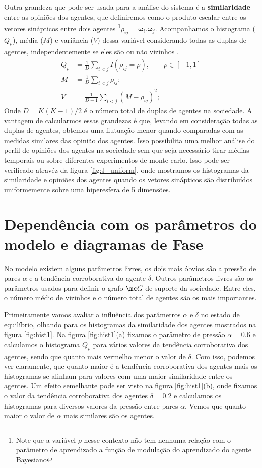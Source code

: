 Outra grandeza que pode ser usada para a análise do sistema é a
\textbf{similaridade} entre as opiniões dos agentes, que definiremos como o
produto escalar entre os vetores sinápticos entre dois agentes \footnote{Note
que a variável $\rho$ nesse contexto não tem nenhuma relação com o
parâmetro de aprendizado a função de modulação do aprendizado do agente
Bayesiano}$ \rho_{ij} = \bm{\omega}_i.\bm{\omega}_j$. Acompanhamos
o histograma ($Q_\rho$), média ($M$) e variância ($V$) dessa variável
considerando todas as duplas de agentes, independentemente se eles são ou
não vizinhos .
\begin{align}
    Q_\rho &= \frac{1}{D}\sum_{i<j}I\left( \rho_{ij} = \rho \right),
        \qquad \rho \in \left[-1, 1\right] \label{eq:overA1} \\
    M &= \frac{1}{D}\sum_{i<j} \rho_{ij}; \label{eq:M}\\ 
    V &= \frac{1}{D-1}\sum_{i<j}\left( M - \rho_{ij} \right)^2; \label{eq:V}
\end{align}
Onde $D = K\left(K-1\right)/2$ é o número total de duplas de agentes
na sociedade. A vantagem de calcularmos essas grandezas é que, levando em
consideração todas as duplas de agentes, obtemos uma flutuação menor quando
comparadas com as medidas similares das opinião dos agentes. Isso possibilita
uma melhor análise do perfil de opiniões dos agentes na sociedade sem que
seja necessário tirar médias temporais ou sobre diferentes experimentos de
monte carlo. Isso pode ser verificado atravéz da figura \ref{fig:J_uniform},
onde mostramos os histogramas da similaridade e opiniões dos agentes quando
os vetores sinápticos são distribuídos uniformemente sobre uma hiperesfera
de 5 dimensões.

\newpage
\section{Dependência com os parâmetros do modelo e diagramas de Fase} %
\label{sec:deppar}

No modelo existem alguns parâmetros livres, os dois mais óbvios são
a pressão de pares $\alpha$ e a tendência corroborativa do agente
$\delta$. Outros parâmetros livres são os parâmetros usados para definir
o grafo  $\mc G$ de suporte da sociedade. Entre eles, o número médio de
vizinhos e o número total de agentes são os mais importantes.

Primeiramente vamos avaliar a influência dos parâmetros $\alpha$ e $\delta$
no estado de equilíbrio, olhando para os histogramas da similaridade dos
agentes mostrados na figura \ref{fig:hist1}. Na figura \ref{fig:hist1}(a)
fixamos o parâmetro de pressão $\alpha=0.6$ e calculamos o histograma
$Q_\rho$ para vários valores da tendência corroborativa dos agentes, sendo
que quanto mais vermelho menor o valor de $\delta$. Com isso, podemos ver
claramente, que quanto maior é a tendência corroborativa dos agentes mais
os histogramas se alinham para valores com uma maior similaridade entre os
agentes. Um efeito semelhante pode ser visto na figura \ref{fig:hist1}(b),
onde fixamos o valor da tendência corroborativa dos agentes $\delta = 0.2$
e calculamos os histogramas para diversos valores da pressão entre pares
$\alpha$. Vemos que quanto maior o valor de $\alpha$ mais similares são
os agentes.

